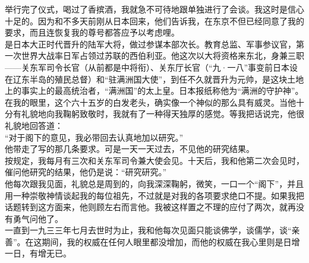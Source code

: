 举行完了仪式，喝过了香摈酒，我就急不可待地跟单独进行了会谈。我这时是信心十足的。因为和不多天前刚从日本回来，他们告诉我，在东京不但已经同意了我的要求，而且连恢复我的尊号都答应予以考虑哩。\\

是日本大正时代晋升的陆军大将，做过参谋本部次长。教育总监、军事参议官，第一次世界大战率日军占领过苏联的西伯利亚。他这次以大将资格来东北，身兼三职——关东军司令长官（从前都是中将衔）、关东厅长官（“九·一八”事变前日本设在辽东半岛的殖民总督）和“驻满洲国大使”，到任不久就晋升为元帅，是这块土地上的事实上的最高统治者，“满洲国”的太上皇。日本报纸称他为“满洲的守护神”。在我的眼里，这个六十五岁的白发老头，确实像一个神似的那么具有威灵。当他十分有礼貌地向我鞠躬致敬时，我就有了一种得天独厚的感觉。等我把话说完，他很礼貌地回答道：\\

“对于阁下的意见，我必带回去认真地加以研究。”\\

他带走了写的那几条要求。可是一天一天过去，不见他的研究结果。\\

按规定，我每月有三次和关东军司令兼大使会见。十天后，我和他第二次会见时，催问他研究的结果，他仍是说：“研究研究。”\\

他每次跟我见面，礼貌总是周到的，向我深深鞠躬，微笑，一口一个“阁下”，并且用一种崇敬神情谈起我的每位祖先，不过就是对我的各项要求绝口不提。如果我把话题转到这方面来，他则顾左右而言他。我被这样置之不理的应付了两次，就再没有勇气问他了。\\

一直到一九三三年七月去世时为止，我和他每次见面只能谈佛学，谈儒学，谈“亲善”。在这期间，我的权威在任何人眼里都没增加，而他的权威在我心里则是日增一日，有增无已。
